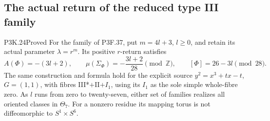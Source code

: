 \subsection{The actual return of the reduced type III family}

\begin{statement}{P3K.24}{Proved}
For the family of P3F.37, put $m=4l+3$, $l\ge0$, and retain
its actual parameter $\lambda=r^m$. Its positive $r$-return
satisfies
\[
 A(\Phi)=-(3l+2),\qquad
 \mu(\Sigma_\Phi)=-\frac{3l+2}{28}\pmod{\mathbb Z},
 \qquad [\Phi]=26-3l\pmod{28}.                         \tag{K24.1}
\]
The same construction and formula hold for the explicit source
$y^2=x^3+tx-t$, $G=(1,1)$, with fibres III*$+$II$+I_1$,
using its $I_1$ as the sole simple whole-fibre zero. As $l$ runs
from zero to twenty-seven, either set of families realizes all
oriented classes in $\Theta_7$. For a nonzero residue its mapping
torus is not diffeomorphic to $S^1\times S^6$.
\end{statement}
